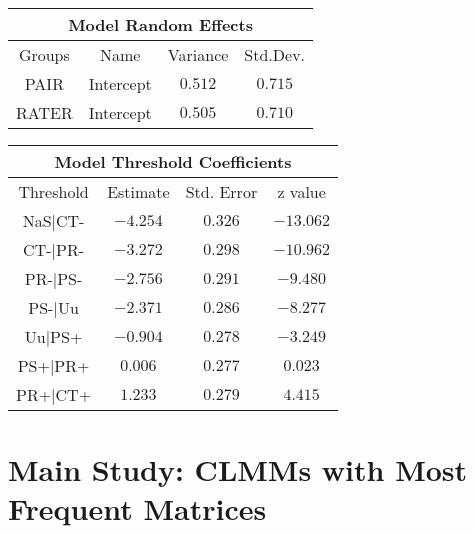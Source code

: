\newpage
\begin{minipage}{\linewidth}
\begin{tabular}{|c|c|c|c|}
\hline
\multicolumn{4}{|c|}{Model Random Effects}\\\hline
Groups  &  Name       &  Variance & Std.Dev.\\\hline
PAIR  & Intercept & $0.512$   & $0.715$  \\\hline
RATER & Intercept & $0.505$   & $0.710$ \\\hline
\end{tabular}
\label{tab:modrand}
\end{minipage}
\newline
\newline
\newline
\begin{minipage}{\linewidth}
\begin{tabular}{|c|c|c|c|}
\hline
\multicolumn{4}{|c|}{Model Threshold Coefficients}\\\hline
Threshold &  Estimate & Std. Error & z value\\\hline
NaS|CT- & $-4.254$ & $0.326$ & $-13.062$\\\hline
CT-|PR- & $-3.272$ & $0.298$ & $-10.962$\\\hline
PR-|PS- & $-2.756$ & $0.291$ & $ -9.480$\\\hline
PS-|Uu  & $-2.371$ & $0.286$ & $ -8.277$\\\hline
Uu|PS+  & $-0.904$ & $0.278$ & $ -3.249$\\\hline
PS+|PR+ & $ 0.006$ & $0.277$ & $  0.023$\\\hline
PR+|CT+ & $ 1.233$ & $0.279$ & $  4.415$\\\hline
\end{tabular}
\label{tab:appmodthres}
\end{minipage}

\section{Main Study: CLMMs with Most Frequent Matrices}
